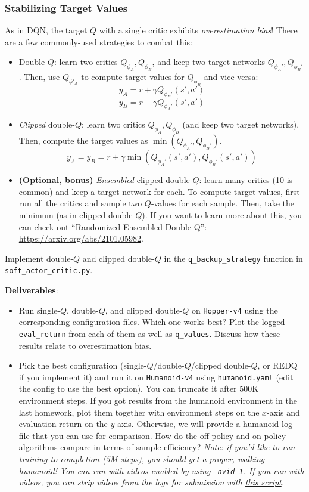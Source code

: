 \subsubsection{Stabilizing Target Values}
As in DQN, the target $Q$ with a single critic exhibits \textit{overestimation bias}! There are a few commonly-used strategies to combat this:
\begin{itemize}
    \item Double-$Q$: learn two critics $Q_{\phi_A}, Q_{\phi_B}$, and keep two target networks $Q_{\phi_A'}, Q_{\phi_B'}$. Then, use $Q_{\phi'_A}$ to compute target values for $Q_{\phi_B}$ and vice versa:
    \[y_A = r + \gamma Q_{\phi_B'}(s', a')\]
    \[y_B = r + \gamma Q_{\phi_A'}(s', a')\]
    \item \textit{Clipped} double-$Q$: learn two critics $Q_{\phi_A}, Q_{\phi_B}$ (and keep two target networks). Then, compute the target values as $\min(Q_{\phi_A'}, Q_{\phi_B'})$.
    \[y_A = y_B = r + \gamma \min\left(Q_{\phi_A'}(s', a'), Q_{\phi_B'}(s', a')\right)\]
    \item \textbf{(Optional, bonus)} \textit{Ensembled} clipped double-$Q$: learn many critics (10 is common) and keep a target network for each. To compute target values, first run all the critics and sample two $Q$-values for each sample. Then, take the minimum (as in clipped double-$Q$). If you want to learn more about this, you can check out ``Randomized Ensembled Double-Q'': \url{https://arxiv.org/abs/2101.05982}.
\end{itemize}
Implement double-$Q$ and clipped double-$Q$ in the \verb|q_backup_strategy| function in \verb|soft_actor_critic.py|.

\textbf{Deliverables}:
\begin{itemize}
    \item Run single-$Q$, double-$Q$, and clipped double-$Q$ on \verb|Hopper-v4| using the corresponding configuration files. Which one works best? Plot the logged \verb|eval_return| from each of them as well as \verb|q_values|. Discuss how these results relate to overestimation bias.
    \item Pick the best configuration (single-$Q$/double-$Q$/clipped double-$Q$, or REDQ if you implement it) and run it on \verb|Humanoid-v4| using \verb|humanoid.yaml| (edit the config to use the best option). You can truncate it after 500K environment steps. If you got results from the humanoid environment in the last homework, plot them together with environment steps on the $x$-axis and evaluation return on the $y$-axis. Otherwise, we will provide a humanoid log file that you can use for comparison. How do the off-policy and on-policy algorithms compare in terms of sample efficiency? \textit{Note: if you'd like to run training to completion (5M steps), you should get a proper, walking humanoid! You can run with videos enabled by using \texttt{-nvid 1}. If you run with videos, you can strip videos from the logs for submission with \href{https://gist.github.com/kylestach/e9964f5f34ee74367547dec83eaf5fae}{this script}.}
\end{itemize}